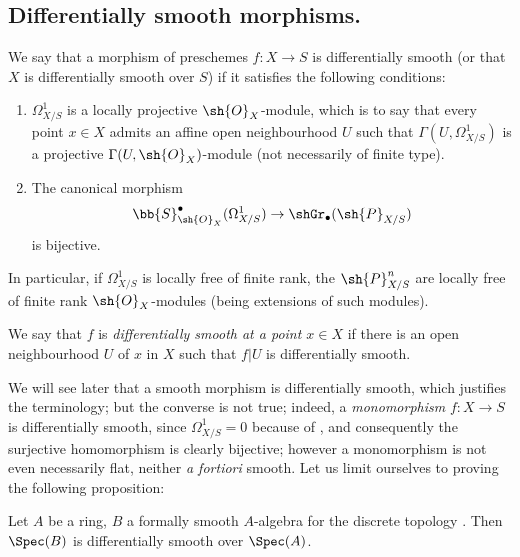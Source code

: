 \subsection{Differentially smooth morphisms.}
\label{IV.16.10}

\begin{definition}[16.10.1]
\label{IV.16.10.1}
We say that a morphism of preschemes $f: X \to S$ is differentially smooth (or that $X$ is differentially smooth over $S$) if it satisfies the following conditions:
\begin{enumerate}
  \item[\rm{(i)}] $\Omega_{X/S}^1$ is a locally projective $\sh{O}_X$-module, which is to say that every point $x \in X$ admits an affine open neighbourhood $U$ such that $\Gamma(U, \Omega_{X/S}^1)$ is a projective $\Gamma(U, \sh{O}_X)$-module (not necessarily of finite type).
  \item[\rm{(ii)}] The canonical morphism 
  \[
    \bb{S}_{\sh{O}_X}^\bullet(\Omega_{X/S}^1) \to \shGr_\bullet(\sh{P}_{X/S})
  \]
  is bijective.
\end{enumerate}

In particular, if $\Omega_{X/S}^1$ is locally free of finite rank, the $\sh{P}_{X/S}^n$ are locally free of finite rank $\sh{O}_X$-modules (being extensions of such modules).
\end{definition}

We say that $f$ is \emph{differentially smooth at a point $x \in X$} if there is an open neighbourhood $U$ of $x$ in $X$ such that $f|U$ is differentially smooth.

We will see later  that a smooth morphism is differentially smooth, which justifies the terminology;
but the converse is not true;
indeed, a \emph{monomorphism} $f:X \to S$ is differentially smooth, since $\Omega^1_{X/S} = 0$ because of , and consequently the surjective homomorphism  is clearly bijective;
however a monomorphism is not even necessarily flat, neither \textit{a fortiori} smooth. 
Let us limit ourselves to proving the following proposition:

\begin{proposition}[16.10.2]
\label{IV.16.10.2}
Let $A$ be a ring, $B$ a formally smooth $A$-algebra for the discrete topology .
Then $\Spec(B)$ is differentially smooth over $\Spec(A)$.
\end{proposition}

